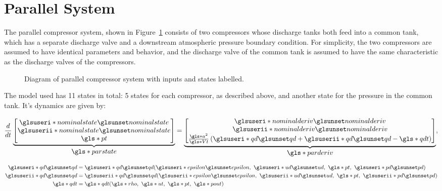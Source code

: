 \section{Parallel System}
\label{sec:mod:parallel}

The parallel compressor system, shown in Figure~\ref{fig:mod:parallel} consists of two compressors whose discharge tanks both feed into a common tank, which has a separate discharge valve and a downstream atmospheric pressure boundary condition.
For simplicity, the two compressors are assumed to have identical parameters and behavior, and the discharge valve of the common tank is assumed to have the same characteristic as the discharge valves of the compressors.

\begin{figure}
  \centering
  
  \caption[Diagram of parallel compressor system.]{Diagram of parallel compressor system with inputs and states labelled.}
  \label{fig:mod:parallel}
\end{figure}



The model used has 11 states in total: 5 states for each compressor, as described above, and another state for the pressure in the common tank. It's dynamics are given by:

\begin{equation}
  \dt{}
  \ubrace{\begin{bmatrix}
    \gi{nominalstate}\\
    \gii{nominalstate}\\
    \g{pt} 
  \end{bmatrix}}{\g{parstate}}
  =
  \ubrace{\begin{bmatrix}
    \gi{nominalderiv}\\
    \gii{nominalderiv}\\
    \frac{\g{a}^2}{\g{Vt}}\left(\gi{qd}+\gii{qd}-\g{qdt}\right)
  \end{bmatrix}}{\g{parderiv}},
\end{equation}

\begin{equation}
  \begin{split}
    \gi{qd} & = \gi{qd}(\gi{epsilon},\ \gi{ud},\ \g{pt},\ \gi{pd})\\
    \gii{qd} & = \gii{qd}(\gii{epsilon},\ \gii{ud},\ \g{pt},\ \gii{pd})\\
    \g{qdt} & = \g{qdt}(\g{rho},\ \g{ut},\ \g{pt},\ \g{pout})
  \end{split}
\end{equation}

